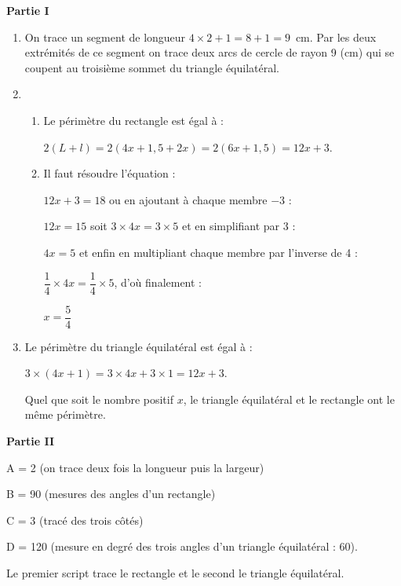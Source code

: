 
\medskip

\textbf{Partie I}

\begin{enumerate}
\item On trace un segment de longueur $4 \times 2 + 1 = 8 + 1 = 9$~cm. Par les deux extrémités de ce segment on trace deux arcs de cercle de rayon 9 (cm) qui se coupent au troisième sommet du triangle équilatéral.
\item
	\begin{enumerate}
		\item Le périmètre du rectangle est égal à :
		
		$2(L + l) = 2(4x + 1,5 + 2x) = 2(6x + 1,5) = 12x + 3$.
		\item Il faut résoudre l'équation :
		
		$12x + 3 = 18$ ou en ajoutant à chaque membre $- 3$ :
		
		$12x = 15$ soit $3 \times 4x = 3 \times 5$ et en simplifiant par 3 :
		
		$4x = 5$ et enfin en multipliant chaque membre par l'inverse de 4 :
		
		$\dfrac{1}{4} \times 4x = \dfrac{1}{4} \times 5$, d'où finalement :
		
		$x = \dfrac{5}{4}$
	\end{enumerate}
\item Le périmètre du triangle équilatéral est égal à : 

$3 \times (4x + 1) = 3 \times 4x + 3 \times 1 = 12x + 3$.

Quel que soit le nombre positif $x$, le triangle équilatéral et le rectangle ont le même périmètre.
\end{enumerate}

\textbf{Partie II}

A = 2 (on trace deux fois la longueur puis la largeur)

B = 90 (mesures des  angles d'un rectangle)

C = 3 (tracé des trois côtés)

D = 120 (mesure en degré des trois angles d'un triangle équilatéral : 60).

Le premier script trace le rectangle et le second le triangle équilatéral.

\vspace{0,5cm}

